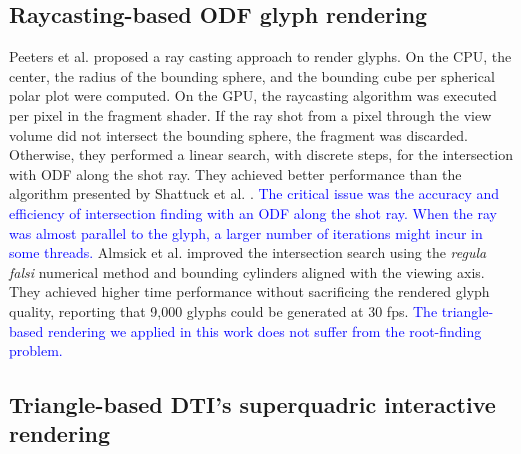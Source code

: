 \documentclass[twoside,twocolumn,10pt]{article}
\begin{document}


 \subsection{Raycasting-based ODF glyph rendering}

Peeters et al. \cite{peeters2009} proposed a ray casting approach to render glyphs. On the CPU, the center, the radius of the bounding sphere, and the bounding cube per spherical polar plot were computed. On the GPU, the raycasting algorithm was executed per pixel in the fragment shader. If the ray shot from a pixel through the view volume did not intersect the bounding sphere, the fragment was discarded. Otherwise, they performed a linear search, with discrete steps, for the intersection with ODF along the shot ray. They achieved better performance than the algorithm presented by Shattuck et al. \cite{shattuck2008}.  \textcolor{blue}{The critical issue was the accuracy and efficiency of intersection finding with an ODF along the shot ray. When the ray was almost parallel to the glyph, a larger number of iterations might incur in some threads.} Almsick et al. \cite{almsick2011} improved the intersection search using the \textit{regula falsi} numerical method and bounding cylinders aligned with the viewing axis. They achieved higher time performance without sacrificing the rendered glyph quality, reporting that 9,000 glyphs could be generated at 30 fps.  \textcolor{blue}{The triangle-based rendering we applied in this work does not suffer from the root-finding problem.} 



\subsection{Triangle-based DTI's superquadric interactive rendering}
\label{ssec:superquadric_rendering}
\end{document}
